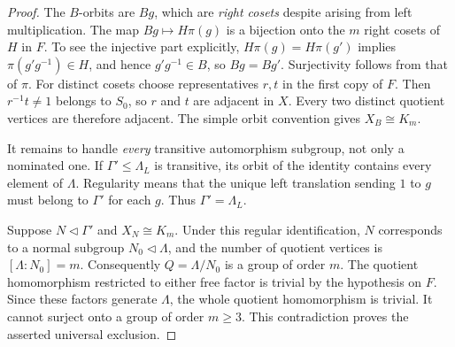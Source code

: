 \documentclass[11pt]{article}
\begin{document}
\begin{proof}
The $B$-orbits are $Bg$, which are \emph{right cosets} despite arising from
left multiplication. The map $Bg\mapsto H\pi(g)$ is a bijection onto the
$m$ right cosets of $H$ in $F$. To see the injective part explicitly,
$H\pi(g)=H\pi(g')$ implies $\pi(g'g^{-1})\in H$, and hence
$g'g^{-1}\in B$, so $Bg=Bg'$. Surjectivity follows from that of $\pi$.
For distinct cosets choose representatives $r,t$ in the first copy of $F$.
Then $r^{-1}t\neq1$ belongs to $S_0$, so $r$ and $t$ are adjacent in $X$.
Every two distinct quotient vertices are therefore adjacent. The simple
orbit convention gives $X_B\cong K_m$.

It remains to handle \emph{every} transitive automorphism subgroup, not
only a nominated one. If $\Gamma'\leq\Lambda_L$ is transitive, its orbit
of the identity contains every element of $\Lambda$. Regularity means
that the unique left translation sending $1$ to $g$ must belong to
$\Gamma'$ for each $g$. Thus $\Gamma'=\Lambda_L$.

Suppose $N\lhd\Gamma'$ and $X_N\cong K_m$. Under this regular
identification, $N$ corresponds to a normal subgroup $N_0\lhd\Lambda$,
and the number of quotient vertices is $[\Lambda:N_0]=m$.
Consequently $Q=\Lambda/N_0$ is a group of order $m$.
The quotient homomorphism restricted to either free factor is trivial by
the hypothesis on $F$. Since these factors generate $\Lambda$, the whole
quotient homomorphism is trivial. It cannot surject onto a group of order
$m\geq3$. This contradiction proves the asserted universal exclusion.
\end{proof}
\end{document}
